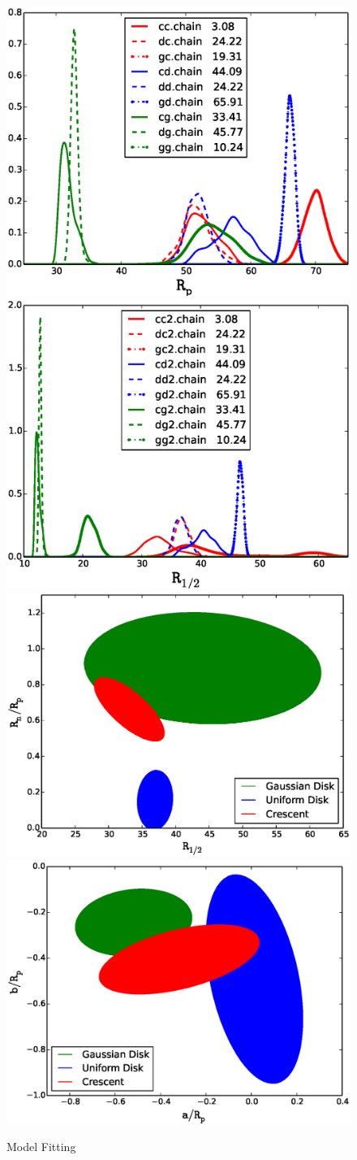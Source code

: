 \begin{figure}
\centering
    \includegraphics[width=0.45\hsize]{plots/Rp4all.eps}
  \includegraphics[width=0.45\hsize]{plots/Rhalf4all.eps}\\
  \includegraphics[width=0.45\hsize]{plots/Rhalf_RnRp.eps}
  \includegraphics[width=0.45\hsize]{plots/aRp_bRp.eps}

\caption{\label{fig:mcmc} Model Fitting}
\end{figure}


